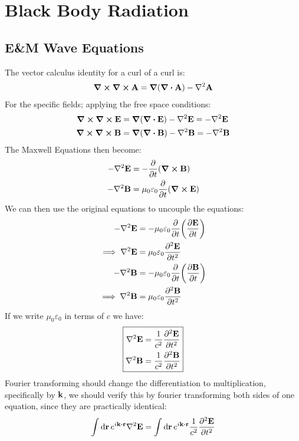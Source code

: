 \documentclass[12pt]{article}
\begin{document}
\section{Black Body Radiation}
\subsection{E\&M Wave Equations}
The vector calculus identity for a curl of a curl is:
\begin{align*}
  \curl{\curl{\vb{A}}}=\grad{(\div{\vb{A}})}-\laplacian{\vb{A}}
\end{align*}
For the specific fields; applying the free space conditions:
\begin{align*}
  \curl{\curl{\vb{E}}}&=\grad{(\div{\vb{E}})}-\laplacian{\vb{E}}
  =-\laplacian{\vb{E}}\\
  \curl{\curl{\vb{B}}}&=\grad{(\div{\vb{B}})}-\laplacian{\vb{B}}
  =-\laplacian{\vb{B}}
\end{align*}
The Maxwell Equations then become:
\begin{align*}
  -\laplacian{\vb{E}}&=-\pdv{t}\qty(\curl{\vb{B}})\\
  -\laplacian{\vb{B}}&=\mu_0\varepsilon_0\pdv{t}\qty(\curl{\vb{E}})
\end{align*}
We can then use the original equations to uncouple the equations:
\begin{align*}
  -\laplacian{\vb{E}}&=-\mu_0\varepsilon_0\pdv{t}\qty(\pdv{\vb{E}}{t})\\
  \implies\laplacian{\vb{E}}&=\mu_0\varepsilon_0\pdv[2]{\vb{E}}{t}\\
  -\laplacian{\vb{B}}&=-\mu_0\varepsilon_0\pdv{t}\qty(\pdv{\vb{B}}{t})\\
  \implies\laplacian{\vb{B}}&=\mu_0\varepsilon_0\pdv[2]{\vb{B}}{t}
\end{align*}
If we write $\mu_0\varepsilon_0$ in terms of $c$ we have:
\begin{equation}
  \boxed{
    \begin{aligned}
      \laplacian{\vb{E}}&=\frac1{c^2}\pdv[2]{\vb{E}}{t}\\
      \laplacian{\vb{B}}&=\frac1{c^2}\pdv[2]{\vb{B}}{t}
    \end{aligned}
  }
\end{equation}
Fourier transforming should change the differentiation to multiplication, specifically by $\vb{k}$, we should verify this by fourier transforming both sides of one equation, since they are practically identical:
\begin{align*}
  \int\dd{\vb{r}}e^{i\vb{k}\vdot\vb{r}}\laplacian{\vb{E}}
  =\int\dd{\vb{r}}e^{i\vb{k}\vdot\vb{r}}\frac1{c^2}\pdv[2]{\vb{E}}{t}
\end{align*}
\end{document}
